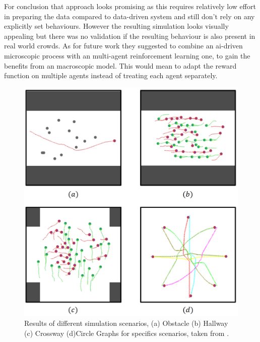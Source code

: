 \documentclass{acmsiggraph}               %
\begin{document}
For conclusion that approach looks promising as this requires relatively low effort in preparing the data compared to data-driven system and still don't rely on any explicitly set behaviours. However the resulting simulation looks visually appealing but there was no validation if the resulting behaviour is also present in real world crowds. As for future work they suggested to combine an ai-driven microscopic process with an multi-agent reinforcement learning one, to gain the benefits from an macroscopic model. This would mean to adapt the reward function on multiple agents instead of treating each agent separately.  

\begin{figure}[h]
  \centering
  \includegraphics[width=1\linewidth]{images/aiSituations.png}
  \caption{Results of different simulation scenarios, (a) Obstacle (b) Hallway (c) Crossway (d)Circle  Graphs for specifics scenarios, taken from \protect\cite{lee_crowd_2018}.}
  \label{fig:aiScenarios}
\end{figure}
\end{document}

